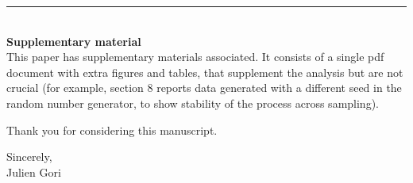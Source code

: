 \documentclass{article}
\begin{document}
\noindent\rule{\textwidth}{0.4pt}\\
\textbf{Supplementary material}\\
This paper has supplementary materials associated. It consists of a single pdf document with extra figures and tables, that supplement the analysis but are not crucial (for example, section 8 reports data generated with a different seed in the random number generator, to show stability of the process across sampling). 

Thank you for considering this manuscript. \\
\begin{flushright}
Sincerely,\\
Julien Gori
\end{flushright}
\end{document}
